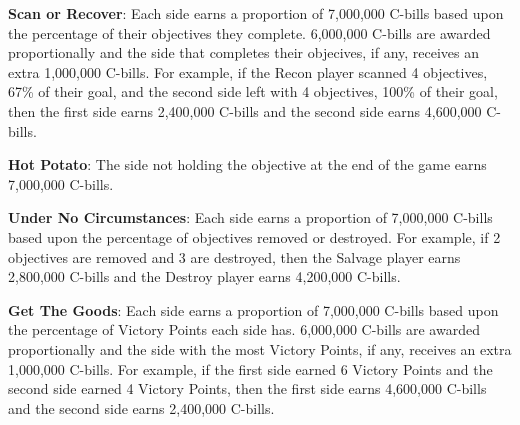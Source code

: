 \begin{description}
\item {\bfseries Scan or Recover}: Each side earns a proportion of 7,000,000 C-bills based upon the percentage of their objectives they complete.
6,000,000 C-bills are awarded proportionally and the side that completes their objecives, if any, receives an extra 1,000,000 C-bills.
For example, if the Recon player scanned 4 objectives, 67\% of their goal, and the second side left with 4 objectives, 100\% of their goal, then the first side earns 2,400,000 C-bills and the second side earns 4,600,000 C-bills.

\item {\bfseries Hot Potato}: The side not holding the objective at the end of the game earns 7,000,000 C-bills.

\item {\bfseries Under No Circumstances}: Each side earns a proportion of 7,000,000 C-bills based upon the percentage of objectives removed or destroyed.
For example, if 2 objectives are removed and 3 are destroyed, then the Salvage player earns 2,800,000 C-bills and the Destroy player earns 4,200,000 C-bills.

\item {\bfseries Get The Goods}: Each side earns a proportion of 7,000,000 C-bills based upon the percentage of Victory Points each side has.
6,000,000 C-bills are awarded proportionally and the side with the most Victory Points, if any, receives an extra 1,000,000 C-bills.
For example, if the first side earned 6 Victory Points and the second side earned 4 Victory Points, then the first side earns 4,600,000 C-bills and the second side earns 2,400,000 C-bills.

\end{description}
